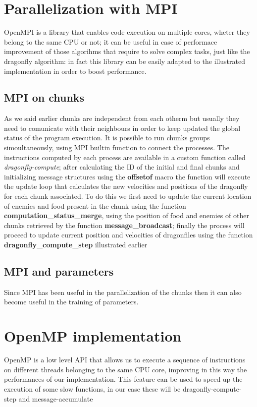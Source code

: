 \documentclass[10pt]{article}
\begin{document}
\begin{multicols}{2}
\section{Parallelization with MPI}

OpenMPI is a library that enables code execution on multiple cores, wheter they belong
to the same CPU or not; it can be useful in case of performace improvement of those algorihms
that require to solve complex tasks, just like the dragonfly algorithm: in fact this library can be easily 
adapted to the illustrated implementation in order to boost performance.

\subsection*{MPI on chunks}
As we said earlier chunks are independent from each otherm but usually they need to comunicate
with their neighbours in order to keep updated the global status of the program execution. 
It is possible to run chunks groups simoultaneously, using MPI builtin function to connect 
the processes.  The instructions computed by each process are available in a custom function
called \textit{dragonfly-compute}; after calculating the ID of the initial and final chunks
and initializing message structures using the \textbf{offsetof} macro
the function will execute the update loop that calculates the new velocities and positions 
of the dragonfly for each chunk associated. To do this we first need to update the current
location of enemies and food present in the chunk using the function \textbf{computation\_status\_merge},
using the position of food and enemies of other chunks retrieved by the function \textbf{message\_broadcast};
finally the process will proceed to update current position and velocities of dragonfiles using 
the function \textbf{dragonfly\_compute\_step} illustrated earlier

\subsection*{MPI and parameters}
Since MPI has been useful in the parallelization of the chunks then it can also become useful in
the training of parameters.

\section{OpenMP implementation}

OpenMP is a low level API that allows us to execute a sequence of instructions on different threads belonging
to the same CPU core, improving in this way the performances of our implementation. This feature can be used to 
speed up the execution of some slow functions, in our case these will be dragonfly-compute-step and message-accumulate


\end{multicols}
\end{document}
